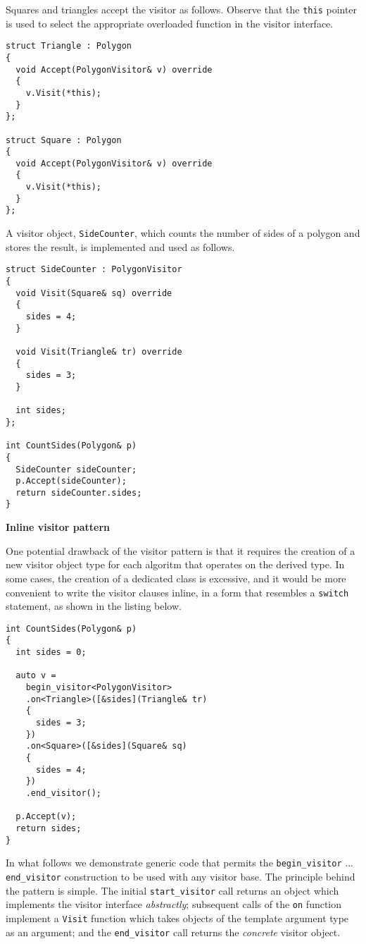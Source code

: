\documentclass[10pt,a4paper,twocolumn]{article}
\renewcommand\section[1]{
    \begin{minipage}[c]{0.94\linewidth}
    \large \raggedright \sffamily \textbf{#1}
    \end{minipage}
}
\newcommand\mycode[1]{{\small\texttt{#1}}}
\begin{document}
Squares and triangles accept the visitor as follows. Observe that the \mycode{this} pointer is used to select the appropriate overloaded function in the visitor interface.

{\small\begin{verbatim}
struct Triangle : Polygon
{
  void Accept(PolygonVisitor& v) override
  {
    v.Visit(*this);
  }
};

struct Square : Polygon
{
  void Accept(PolygonVisitor& v) override
  {
    v.Visit(*this);
  }
};
\end{verbatim}}

A visitor object, \mycode{SideCounter}, which counts the number of sides of a polygon and stores the result, is implemented and used as follows.

{\small\begin{verbatim}
struct SideCounter : PolygonVisitor
{
  void Visit(Square& sq) override
  {
    sides = 4;
  }
  
  void Visit(Triangle& tr) override
  {
    sides = 3;
  }
  
  int sides;
};

int CountSides(Polygon& p)
{
  SideCounter sideCounter;
  p.Accept(sideCounter);
  return sideCounter.sides;
}
\end{verbatim}}

\section{Inline visitor pattern}

One potential drawback of the visitor pattern is that it requires the creation of a new visitor object type for each algoritm that operates on the derived type. In some cases, the creation of a dedicated class is excessive, and it would be more convenient to write the visitor clauses inline, in a form that resembles a \mycode{switch} statement, as shown in the listing below.

{\small\begin{verbatim}
int CountSides(Polygon& p)
{
  int sides = 0;
  
  auto v =
    begin_visitor<PolygonVisitor>
    .on<Triangle>([&sides](Triangle& tr)
    {
      sides = 3;
    })
    .on<Square>([&sides](Square& sq)
    {
      sides = 4;
    })
    .end_visitor();
  
  p.Accept(v);
  return sides;
}
\end{verbatim}}

In what follows we demonstrate generic code that permits the \mycode{begin\_visitor} ... \mycode{end\_visitor} construction to be used with any visitor base. The principle behind the pattern is simple. The initial \mycode{start\_visitor} call returns an object which implements the visitor interface \emph{abstractly}; subsequent calls of the \mycode{on} function implement a \mycode{Visit} function which takes objects of the template argument type as an argument; and the \mycode{end\_visitor} call returns the \emph{concrete} visitor object.
\end{document}
